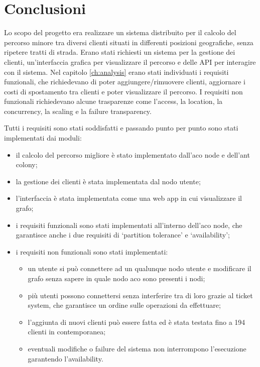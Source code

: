 \chapter{Conclusioni}
Lo scopo del progetto era realizzare un sistema distribuito per il calcolo del percorso minore tra diversi clienti situati in differenti posizioni geografiche, senza ripetere tratti di strada.
Erano stati richiesti un sistema per la gestione dei clienti, un'interfaccia grafica per visualizzare il percorso e delle API per interagire con il sistema.
Nel capitolo \ref{ch:analysis} erano stati individuati i requisiti funzionali, che richiedevano di poter aggiungere/rimuovere clienti, aggiornare i costi di spostamento tra clienti e poter visualizzare il percorso.
I requisiti non funzionali richiedevano alcune trasparenze come l'access, la location, la concurrency, la scaling e la failure transparency.

Tutti i requisiti sono stati soddisfatti e passando punto per punto sono stati implementati dai moduli:
\begin{itemize}
    \item il calcolo del percorso migliore è stato implementato dall'aco node e dell'ant colony;
    \item la gestione dei clienti è stata implementata dal nodo utente;
    \item l'interfaccia è stata implementata come una web app in cui visualizzare il grafo;
    \item i requisiti funzionali sono stati implementati all'interno dell'aco node, che garantisce anche i due requisiti di `partition tolerance' e `availability';
    \item i requisiti non funzionali sono stati implementati:
    \begin{itemize}
        \item un utente si può connettere ad un qualunque nodo utente e modificare il grafo senza sapere in quale nodo aco sono presenti i nodi; 
        \item più utenti possono connettersi senza interferire tra di loro grazie al ticket system, che garantisce un ordine sulle operazioni da effettuare; 
        \item l'aggiunta di nuovi clienti può essere fatta ed è stata testata fino a 194 clienti in contemporanea; 
        \item eventuali modifiche o failure del sistema non interrompono l'esecuzione garantendo l'availability.
    \end{itemize}     
\end{itemize}

